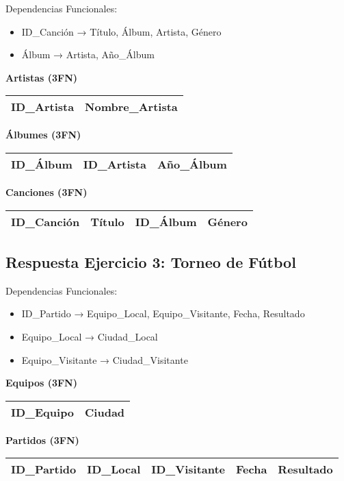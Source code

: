 \documentclass[12pt]{article}
\begin{document}
Dependencias Funcionales:
\begin{itemize}
    \item ID\_Canción → Título, Álbum, Artista, Género
    \item Álbum → Artista, Año\_Álbum
\end{itemize}

\textbf{Artistas (3FN)}
\begin{center}
\begin{tabular}{|l|l|}
\hline
ID\_Artista & Nombre\_Artista \\
\hline
\end{tabular}
\end{center}

\textbf{Álbumes (3FN)}
\begin{center}
\begin{tabular}{|l|l|l|}
\hline
ID\_Álbum & ID\_Artista & Año\_Álbum \\
\hline
\end{tabular}
\end{center}

\textbf{Canciones (3FN)}
\begin{center}
\begin{tabular}{|l|l|l|l|}
\hline
ID\_Canción & Título & ID\_Álbum & Género \\
\hline
\end{tabular}
\end{center}

\subsection{Respuesta Ejercicio 3: Torneo de Fútbol}

Dependencias Funcionales:
\begin{itemize}
    \item ID\_Partido → Equipo\_Local, Equipo\_Visitante, Fecha, Resultado
    \item Equipo\_Local → Ciudad\_Local
    \item Equipo\_Visitante → Ciudad\_Visitante
\end{itemize}

\textbf{Equipos (3FN)}
\begin{center}
\begin{tabular}{|l|l|}
\hline
ID\_Equipo & Ciudad \\
\hline
\end{tabular}
\end{center}

\textbf{Partidos (3FN)}
\begin{center}
\begin{tabular}{|l|l|l|l|l|}
\hline
ID\_Partido & ID\_Local & ID\_Visitante & Fecha & Resultado \\
\hline
\end{tabular}
\end{center}
\end{document}
